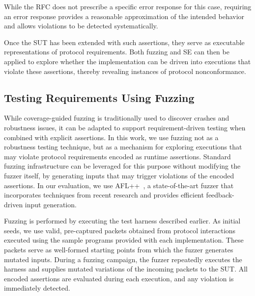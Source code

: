 While the RFC does not prescribe a specific error response for this case, requiring an error response provides a reasonable approximation of the intended behavior and allows violations to be detected systematically.

Once the SUT has been extended with such assertions, they serve as executable representations of protocol requirements.
Both fuzzing and SE can then be applied to explore whether the implementation can be driven into executions that violate these assertions, thereby revealing instances of protocol nonconformance.

\subsection{Testing Requirements Using Fuzzing}
While coverage-guided fuzzing is traditionally used to discover crashes and robustness issues, it can be adapted to support requirement-driven testing when combined with explicit assertions.
In this work, we use fuzzing not as a robustness testing technique, but as a mechanism for exploring executions that may violate protocol requirements encoded as runtime assertions.
Standard fuzzing infrastructure can be leveraged for this purpose without modifying the fuzzer itself, by generating inputs that may trigger violations of the encoded assertions.
In our evaluation, we use AFL++~\cite{AFLplusplus-Woot20}, a state-of-the-art fuzzer that incorporates techniques from recent research and provides efficient feedback-driven input generation.

Fuzzing is performed by executing the test harness described earlier.
As initial seeds, we use valid, pre-captured packets obtained from protocol interactions executed using the sample programs provided with each implementation.
These packets serve as well-formed starting points from which the fuzzer generates mutated inputs.
During a fuzzing campaign, the fuzzer repeatedly executes the harness and supplies mutated variations of the incoming packets to the SUT.
All encoded assertions are evaluated during each execution, and any violation is immediately detected.

